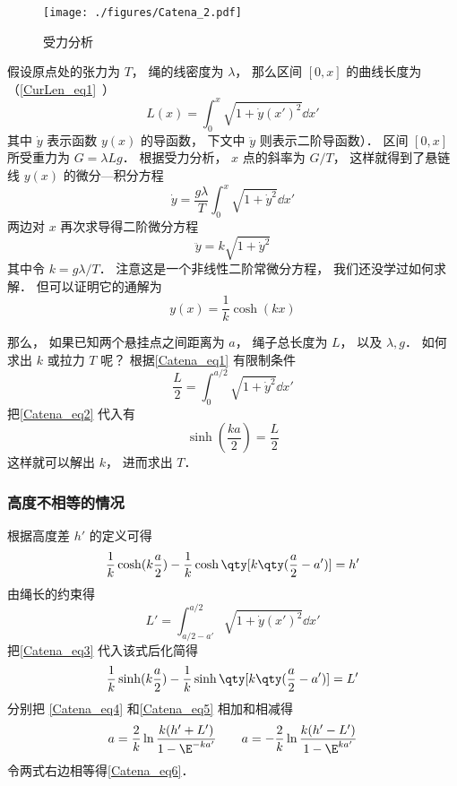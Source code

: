 \begin{figure}[ht]
\centering
\texttt{[image: ./figures/Catena\_2.pdf]}
\caption{受力分析} \label{Catena_fig2}
\end{figure}
假设原点处的张力为 $T$， 绳的线密度为 $\lambda$， 那么区间 $[0, x]$ 的曲线长度为（\autoref{CurLen_eq1}~）
\begin{equation}\label{Catena_eq1}
L(x) = \int_0^x \sqrt{1 + \dot y(x')^2} \dd{x'}
\end{equation}
其中 $\dot y$ 表示函数 $y(x)$ 的导函数， 下文中 $\ddot y$ 则表示二阶导函数）． 区间 $[0, x]$ 所受重力为 $G = \lambda L g$． 根据受力分析， $x$ 点的斜率为 $G/T$， 这样就得到了悬链线 $y(x)$ 的微分—积分方程
\begin{equation}
\dot y = \frac{g\lambda}{T} \int_0^x \sqrt{1 + \dot y^2} \dd{x'}
\end{equation}
两边对 $x$ 再次求导得二阶微分方程
\begin{equation}
\ddot y = k \sqrt{1 + \dot y^2}
\end{equation}
其中令 $k = g\lambda/T$． 注意这是一个非线性二阶常微分方程， 我们还没学过如何求解． 但可以证明它的通解为
\begin{equation}\label{Catena_eq2}
y(x) = \frac{1}{k}\cosh(kx)
\end{equation}

那么， 如果已知两个悬挂点之间距离为 $a$， 绳子总长度为 $L$， 以及 $\lambda, g$． 如何求出 $k$ 或拉力 $T$ 呢？ 根据\autoref{Catena_eq1} 有限制条件
\begin{equation}
\frac{L}{2} = \int_0^{a/2} \sqrt{1 + \dot y^2} \dd{x'}
\end{equation}
把\autoref{Catena_eq2} 代入有
\begin{equation}
\sinh(\frac{ka}{2}) = \frac{L}{2}
\end{equation}
这样就可以解出 $k$， 进而求出 $T$．

\subsubsection{高度不相等的情况}
根据高度差 $h'$ 的定义可得
\begin{equation}\label{Catena_eq4}
\frac{1}{k}\cosh(k\frac{a}{2}) - \frac{1}{k}\cosh\qty[k\qty(\frac{a}{2}-a')] = h'
\end{equation}
由绳长的约束得
\begin{equation}
L' = \int_{a/2-a'}^{a/2} \sqrt{1 + \dot y(x')^2} \dd{x'}
\end{equation}
把\autoref{Catena_eq3} 代入该式后化简得
\begin{equation}\label{Catena_eq5}
\frac{1}{k}\sinh(k\frac{a}{2}) - \frac{1}{k}\sinh\qty[k\qty(\frac{a}{2}-a')] = L'
\end{equation}
分别把 \autoref{Catena_eq4} 和\autoref{Catena_eq5} 相加和相减得
\begin{equation}
a = \frac{2}{k} \ln\frac{k(h'+L')}{1 - \E^{-ka'}}
\qquad
a = -\frac{2}{k} \ln\frac{k(h'-L')}{1 - \E^{ka'}}
\end{equation}
令两式右边相等得\autoref{Catena_eq6}．
